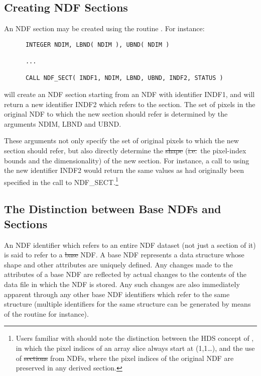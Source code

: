 \subsection{\label{ss:creatingsections}Creating NDF Sections}

An NDF section may be created using the routine .
For instance:

\small
\begin{verbatim}
      INTEGER NDIM, LBND( NDIM ), UBND( NDIM )

      ...

      CALL NDF_SECT( INDF1, NDIM, LBND, UBND, INDF2, STATUS )
\end{verbatim}
\normalsize

will create an NDF section starting from an NDF with identifier INDF1, and
will return a new identifier INDF2 which refers to the section. 
The set of pixels in the original NDF to which the new section should refer
is determined by the arguments NDIM, LBND and UBND.

These arguments not only specify the set of original pixels to which
the new section should refer, but also directly determine the
\st{shape\/} (\st{i.e.}\ the pixel-index bounds and the
dimensionality) 
of the new section.
For instance, a call to  using the new identifier INDF2 would 
return the same values as had originally been specified in the call to
NDF\_SECT.\footnote{Users familiar with  should
note the distinction between the HDS concept of
, in which the pixel
indices of an 
array slice always start at (1,1\ldots), and the use of
\st{sections\/} from NDFs, where the pixel indices of the original NDF
are 
preserved in any derived section.}

\subsection{The Distinction between Base NDFs and Sections}

An NDF identifier which refers to an entire NDF dataset (not just a section
of it) is said to refer to a \st{base\/} NDF.
A base NDF represents a data structure whose shape and other attributes are
uniquely defined. 
Any changes made to the attributes of a base NDF are reflected by actual
changes to the contents of the data file in which the NDF is stored. 
Any such changes are also immediately apparent through any other base NDF
identifiers which refer to the same structure (multiple identifiers for the
same structure can be generated by means of the routine  for
instance). 

